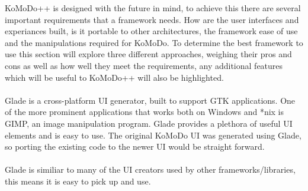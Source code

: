 %
KoMoDo++ is designed with the future in mind, to achieve this there are several important requirements that a framework needs. How are the user interfaces and experiances built, is it portable to other architectures, the framework ease of use and the manipulations required for KoMoDo. To determine the best framework to use this section will explore three different approaches, weighing their pros and cons as well as how well they meet the requirements, any additional features which will be useful to KoMoDo++ will also be highlighted.\\\\
%
  Glade is a cross-platform UI generator, built to support GTK applications. One of the more prominent applications that works both on Windows and *nix is GIMP, an image manipulation program. Glade provides a plethora of useful UI elements and is easy to use. The original KoMoDo UI was generated using Glade, so porting the existing code to the newer UI would be straight forward.\\\\
  Glade is similiar to many of the UI creators used by other frameworks/libraries, this means it is easy to pick up and use.

